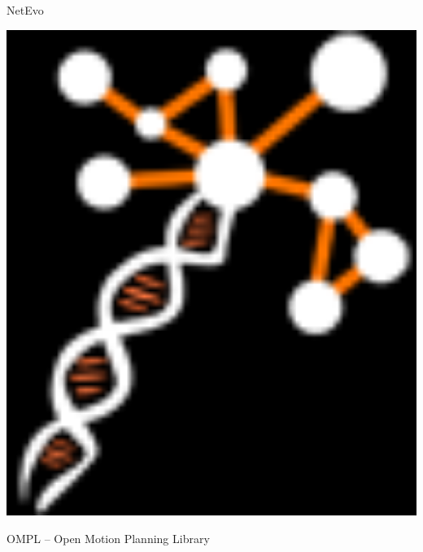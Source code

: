 \begin{frame}[fragile]
 

\vspace{4ex}



\begin{minipage}{0.2\textwidth}
 \begin{center}
  NetEvo

  \vspace{1ex}
  
  \includegraphics[draft=false,width=1.0\textwidth]{netevo.png}
 \end{center}
\end{minipage}
\hspace{4ex}\begin{minipage}{0.4\textwidth}
 \begin{center}
  OMPL -- Open Motion Planning Library
 \end{center}
\end{minipage}


\end{frame}


